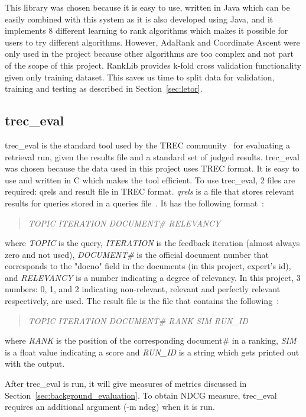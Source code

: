 This library was chosen because it is easy to use, written in Java which can be easily combined with this system as it is also developed using Java, and
it implements 8 different learning to rank algorithms which makes it possible for users to try different algorithms.
However, AdaRank and Coordinate Ascent were only used in the project because other algorithms are too complex and not part of the scope of this project.
RankLib provides k-fold cross validation functionality given only training dataset. This saves us time to split data for validation, training and 
testing as described in Section~\ref{sec:letor}.

\subsection{trec\_eval}\label{sec:treceval}
trec\_eval is the standard tool used by the TREC community~\cite{trec} for evaluating a retrieval run, given the results file and a
standard set of judged results. trec\_eval was chosen because the data used in this project uses TREC format. 
It is easy to use and written in C which makes the tool efficient. To use trec\_eval, 2 files are required: qrels and result file in TREC format.
\textit{qrels} is a file that stores relevant results for queries stored in a queries file~\cite{qrels}. It has the following format~\cite{qrelsformat}:
\begin{quotation}
 \textit{TOPIC ITERATION DOCUMENT\# RELEVANCY}
\end{quotation}
where \textit{TOPIC} is the query, \textit{ITERATION} is the feedback iteration (almost always zero and not used),
\textit{DOCUMENT\#} is the official document number that corresponds to the "docno" field in the documents (in this project, expert's id), and
\textit{RELEVANCY} is a number indicating a degree of relevancy. In this project, 3 numbers: 0, 1, and 2 indicating non-relevant, relevant and perfectly
relevant respectively, are used. The result file is the file that contains the following~\cite{resultfileformat}:
\begin{quotation}
 \textit{TOPIC ITERATION DOCUMENT\# RANK SIM RUN\_ID}
\end{quotation}
where \textit{RANK} is the position of the corresponding document\# in a ranking, \textit{SIM} is a float value indicating a score and \textit{RUN\_ID}
is a string which gets printed out with the output.

After trec\_eval is run, it will give measures of metrics discussed in Section~\ref{sec:background_evaluation}. To obtain NDCG measure, trec\_eval requires
an additional argument (-m ndcg) when it is run.




